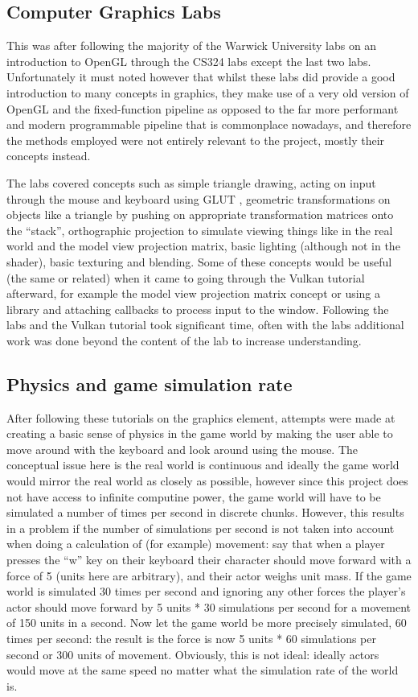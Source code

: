 \documentclass[titlepage]{article}
\begin{document}
	\subsection*{Computer Graphics Labs}

	This was after following the majority of the Warwick University labs on an introduction to OpenGL through the CS324 labs \cite{Bhalerao} except the last two labs. Unfortunately it must noted however that whilst these labs did provide a good introduction to many concepts in graphics, they make use of a very old version of OpenGL and the fixed-function pipeline as opposed to the far more performant and modern programmable pipeline that is commonplace nowadays, and therefore the methods employed were not entirely relevant to the project, mostly their concepts instead.

	The labs covered concepts such as simple triangle drawing, acting on input through the mouse and keyboard using GLUT \cite{GLUT}, geometric transformations on objects like a triangle by pushing on appropriate transformation matrices onto the ``stack'', orthographic projection to simulate viewing things like in the real world and the model view projection matrix, basic lighting (although not in the shader), basic texturing and blending. Some of these concepts would be useful (the same or related) when it came to going through the Vulkan tutorial afterward, for example the model view projection matrix concept or using a library and attaching callbacks to process input to the window. Following the labs and the Vulkan tutorial took significant time, often with the labs additional work was done beyond the content of the lab to increase understanding.

	\subsection*{Physics and game simulation rate}

	After following these tutorials on the graphics element, attempts were made at creating a basic sense of physics in the game world by making the user able to move around with the keyboard and look around using the mouse. The conceptual issue here is the real world is continuous and ideally the game world would mirror the real world as closely as possible, however since this project does not have access to infinite computine power, the game world will have to be simulated a number of times per second in discrete chunks. However, this results in a problem if the number of simulations per second is not taken into account when doing a calculation of (for example) movement: say that when a player presses the ``w'' key on their keyboard their character should move forward with a force of 5 (units here are arbitrary), and their actor weighs unit mass. If the game world is simulated 30 times per second and ignoring any other forces the player's actor should move forward by 5 units * 30 simulations per second for a movement of 150 units in a second. Now let the game world be more precisely simulated, 60 times per second: the result is the force is now 5 units * 60 simulations per second or 300 units of movement. Obviously, this is not ideal: ideally actors would move at the same speed no matter what the simulation rate of the world is.
\end{document}
